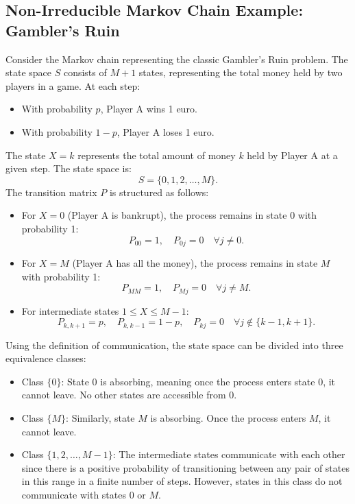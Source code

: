 \subsection{Non-Irreducible Markov Chain Example: Gambler's Ruin}  
Consider the Markov chain representing the classic Gambler's Ruin problem. The state space \( S \) consists of \( M+1 \) states, representing the total money held by two players in a game. At each step:
\begin{itemize}
    \item With probability \( p \), Player A wins 1 euro.
    \item With probability \( 1-p \), Player A loses 1 euro.
\end{itemize}
The state \( X = k \) represents the total amount of money \( k \) held by Player A at a given step. The state space is:
\[
S = \{0, 1, 2, \dots, M\}.
\]
The transition matrix \( P \) is structured as follows:
\begin{itemize}
    \item For \( X = 0 \) (Player A is bankrupt), the process remains in state 0 with probability 1:
    \[
    P_{00} = 1, \quad P_{0j} = 0 \quad \forall j \neq 0.
    \]
    \item For \( X = M \) (Player A has all the money), the process remains in state \( M \) with probability 1:
    \[
    P_{MM} = 1, \quad P_{Mj} = 0 \quad \forall j \neq M.
    \]
    \item For intermediate states \( 1 \leq X \leq M-1 \):
    \[
    P_{k,k+1} = p, \quad P_{k,k-1} = 1-p, \quad P_{kj} = 0 \quad \forall j \notin \{k-1, k+1\}.
    \]
\end{itemize}
Using the definition of communication, the state space can be divided into three equivalence classes:
\begin{itemize}
    \item Class \( \{0\} \): State \( 0 \) is absorbing, meaning once the process enters state \( 0 \), it cannot leave. No other states are accessible from \( 0 \).
    \item Class \( \{M\} \): Similarly, state \( M \) is absorbing. Once the process enters \( M \), it cannot leave.
    \item Class \( \{1, 2, \dots, M-1\} \): The intermediate states communicate with each other since there is a positive probability of transitioning between any pair of states in this range in a finite number of steps. However, states in this class do not communicate with states \( 0 \) or \( M \).
\end{itemize}
